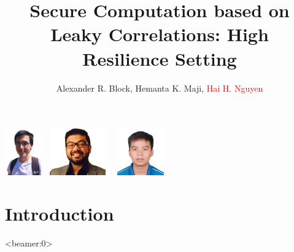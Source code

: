 \documentclass[
  xcolor={svgnames}, 
  hyperref={citecolor=DeepPink4,linkcolor=DarkRed,urlcolor=DarkBlue},
]{beamer}
\title[]{Secure Computation based on Leaky Correlations: High Resilience Setting}
\author[BMN]{Alexander R. Block, Hemanta K. Maji, \textcolor{red}{Hai H. Nguyen}}
\institute{Purdue University}
\date{}
\let\otp\titlepage
\renewcommand{\titlepage}{\otp\addtocounter{framenumber}{-1}}
\begin{document}
\begin{frame}[plain]
\titlepage

\begin{center}
	\includegraphics[height=2cm, keepaspectratio]{alex}\ \
	\includegraphics[height=2cm, keepaspectratio]{maji} \ \ 
	\includegraphics[height=2cm, keepaspectratio]{hai}
\end{center}
\end{frame}



\section{Introduction}

%











\begin{frame}<beamer:0>
	
	
\end{frame}
\end{document}
